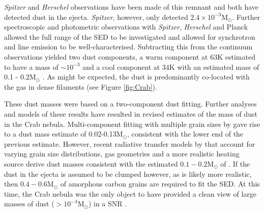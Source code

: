 \textit{Spitzer} and \textit{Herschel} observations have been made of this remnant and both have detected dust in the ejecta.  {\em Spitzer}, however, only detected $2.4\times10^{-3}$M$_{\odot}$.  Further spectroscopic and photometric observations with {\em Spitzer}, {\em Herschel} and Planck allowed the full range of the SED to be investigated and allowed for synchrotron and line emission to be well-characterised.  Subtracting this from the continuum observations yielded two dust components, a warm component at 63K estimated to have a mass of $\sim10^{-3}$ and a cool component at  34K with an estimated mass of 0.1 - 0.2M$_{\odot}$ \citep{Gomez2012,Temim2012}.  As might be expected, the dust is predominantly co-located with the gas in dense filaments (see Figure \ref{fig:Crab}).
 
 These dust masses were based on a two-component dust fitting.  Further analyses and models of these results have resulted in revised estimates of the mass of dust in the Crab nebula.  Multi-component fitting with multiple grain sizes by \citet{Temim2013} gave rise to a dust mass estimate of 0.02-0.13M$_{\odot}$, consistent with the lower end of the previous estimate.  However, recent radiative transfer models by \citet{Owen2015} that account for varying grain size distributions, gas geometries and a more realistic heating source derive dust masses consistent with the estimated $0.1-0.2$M$_{\odot}$ of \citet{Gomez2012}.  If the dust in the ejecta is assumed to be clumped however, as is likely more realistic, then $0.4 - 0.6$M$_{\odot}$ of amorphous carbon grains are required to fit the SED.  At this time, the Crab nebula was the only object to have provided a clean view of large masses of dust ($>10^{-3}$M$_{\odot}$) in a SNR .
 

